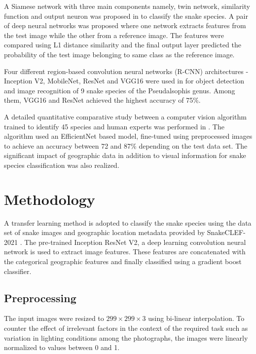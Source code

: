 \documentclass[
]{ceurart}
\begin{document}
A Siamese network with three main components namely, twin network, similarity function and output neuron was proposed in \cite{abeysinghe} to classify the snake species. A pair of deep neural networks was proposed where one network extracts features from the test image while the other from a reference image. The features were compared using L1 distance similarity and the final output layer predicted the probability of the test image belonging to same class as the reference image.

Four different region-based convolution neural networks (R-CNN) architectures - Inception V2, MobileNet, ResNet and VGG16 were used in \cite{patel} for object detection and image recognition of 9 snake species of the Pseudalsophis genus. Among them, VGG16 and ResNet achieved the highest accuracy of 75\%.

A detailed quantitative comparative study between a computer vision algorithm trained to identify 45 species and human experts was performed in \cite{durso}. The algorithm used an EfficientNet based model, fine-tuned using preprocessed images to achieve an accuracy between 72 and 87\% depending on the test data set. The significant impact of geographic data in addition to visual information for snake species classification was also realized.

\section{Methodology}

A transfer learning method is adopted to classify the snake species using the data set of snake images and geographic location metadata provided by SnakeCLEF-2021 \cite{lifeclef2021, snakeclef2021}. The pre-trained Inception ResNet V2, a deep learning convolution neural network is used to extract image features. These features are concatenated with the categorical geographic features and finally classified using a gradient boost classifier.

\subsection{Preprocessing}

The input images were resized to $299\times299\times3$ using bi-linear interpolation. To counter the effect of irrelevant factors in the context of the required task such as variation in lighting conditions among the photographs, the images were linearly normalized to values between 0 and 1.
\end{document}
